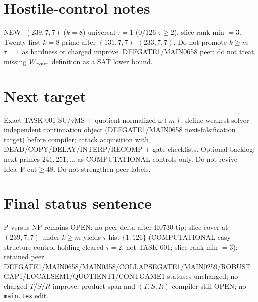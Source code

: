 \documentclass[11pt]{article}
\begin{document}
\section*{Hostile-control notes}
NEW: $(239,7,7)$ ($k{=}8$) universal $\tau{=}1$ ($0/126$ $\tau{\ge}2$), slice-rank min $=3$.
Twenty-first $k{=}8$ prime after $(131,7,7)$--$(233,7,7)$.
Do not promote $k{\ge}m$ $\tau{=}1$ as hardness or charged improve.
DEFGATE1/MAIN0658 peer: do not treat missing $W_{\rm exact}$ definition as a SAT lower bound.

\section*{Next target}
Exact TASK-001 SU/vMS + quotient-normalized $\omega(m)$; define weakest solver-independent
continuation object (DEFGATE1/MAIN0658 next-falsification target) before compiler;
attack acquisition with DEAD/COPY/DELAY/INTERP/RECOMP + gate checklists.
Optional backlog: next primes $241,251,\ldots$ as COMPUTATIONAL controls only.
Do not revive Idea~F cut$\ge48$. Do not strengthen peer labels.

\section*{Final status sentence}
P versus NP remains OPEN; no peer delta after H0730 tip; slice-cover at $(239,7,7)$ under $k{\ge}m$ yields $\tau$-hist $\{1{:}126\}$ (COMPUTATIONAL easy-structure control holding cleared $\tau{=}2$, not TASK-001; slice-rank min $=3$); retained peer DEFGATE1/MAIN0658/MAIN0358/COLLAPSEGATE1/MAIN0259/ROBUSTGAP1/LOCALSEM1/QUOTIENT1/CONTGAME1 statuses unchanged; no charged $T$/$S$/$R$ improve; product-span and $(T,S,R)$ compiler still OPEN; no \texttt{main.tex} edit.
\end{document}
